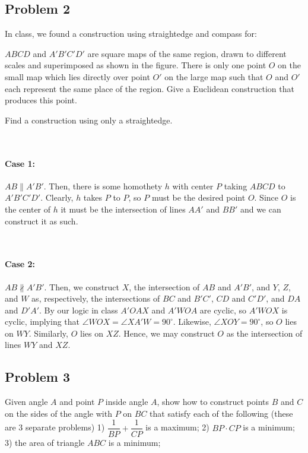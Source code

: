 \subsection{Problem 2}

In class, we found a construction using straightedge and compass for:

$ABCD$ and $A'B'C'D'$ are square maps of the same region, drawn to different scales and superimposed as shown in the figure. There is only one point $O$ on the small map which lies directly over point $O'$ on the large map such that $O$ and $O'$ each represent the same place of the region. Give a Euclidean construction that produces this point.

Find a construction using only a straightedge.

\begin{mdsoln}
~\paragraph{Case 1:} $AB\parallel A'B'$. Then, there is some homothety $h$ with center $P$ taking $ABCD$ to $A'B'C'D'$. Clearly, $h$ takes $P$ to $P$, so $P$ must be the desired point $O$. Since $O$ is the center of $h$ it must be the intersection of lines $AA'$ and $BB'$ and we can construct it as such.


~\paragraph{Case 2:} $AB\not\parallel A'B'$. Then, we construct $X$, the intersection of $AB$ and $A'B'$, and $Y$, $Z$, and $W$ as, respectively, the intersections of $BC$ and $B'C'$, $CD$ and $C'D'$, and $DA$ and $D'A'$. By our logic in class $A'OAX$ and $A'WOA$ are cyclic, so $A'WOX$ is cyclic, implying that $\angle WOX=\angle XA'W=90^\circ$. Likewise, $\angle XOY=90^\circ$, so $O$ lies on $WY$. Similarly, $O$ lies on $XZ$. Hence, we may construct $O$ as the intersection of lines $WY$ and $XZ$.

\end{mdsoln}
\subsection{Problem 3}

Given angle $A$ and point $P$ inside angle $A$, show how to construct points $B$ and $C$ on the sides of the angle with $P$ on $BC$ that satisfy each of the following (these are 3 separate problems)
1) $\dfrac 1{BP} + \dfrac 1{CP}$ is a maximum;
2) $BP \cdot CP$ is a minimum;
3) the area of triangle $ABC$ is a minimum;

